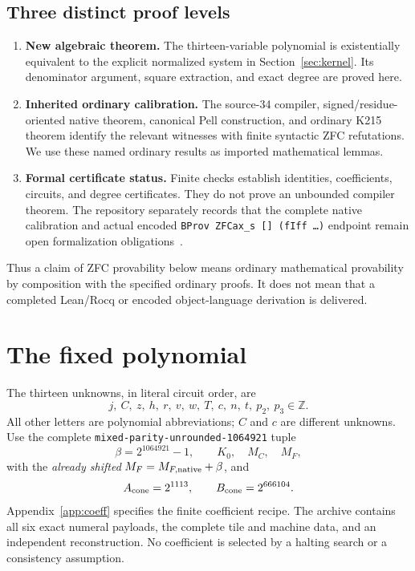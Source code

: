 \documentclass[11pt,a4paper]{article}
\theoremstyle{definition}\newtheorem{definition}[theorem]{Definition}
\theoremstyle{remark}\newtheorem{remark}[theorem]{Remark}
\newcommand{\Z}{\mathbb Z}\newcommand{\Q}{\mathbb Q}\newcommand{\N}{\mathbb N}
\numberwithin{equation}{section}
\begin{document}
\subsection{Three distinct proof levels}
\begin{enumerate}
\item \textbf{New algebraic theorem.} The thirteen-variable polynomial is
existentially equivalent to the explicit normalized system in
Section~\ref{sec:kernel}. Its denominator argument, square extraction,
and exact degree are proved here.
\item \textbf{Inherited ordinary calibration.} The source-34 compiler,
signed/residue-oriented native theorem, canonical Pell construction,
and ordinary K215 theorem identify the relevant witnesses with finite
syntactic ZFC refutations. We use these named ordinary results as
imported mathematical lemmas.
\item \textbf{Formal certificate status.} Finite checks establish
identities, coefficients, circuits, and degree certificates. They do not
prove an unbounded compiler theorem. The repository separately records
that the complete native calibration and actual encoded
\texttt{BProv ZFCax\_s [] (fIff \ldots)} endpoint remain open
formalization obligations~\cite{boundary,calibration}.
\end{enumerate}

Thus a claim of ZFC provability below means ordinary mathematical
provability by composition with the specified ordinary proofs.
It does not mean that a completed Lean/Rocq or encoded object-language
derivation is delivered.

\section{The fixed polynomial}\label{sec:equation}

The thirteen unknowns, in literal circuit order, are
\[
\boxed{j,\ C,\ z,\ h,\ r,\ v,\ w,\ T,\ c,\ n,\ t,\ p_2,\ p_3\in\Z.}
\]
All other letters are polynomial abbreviations; \(C\) and \(c\) are
different unknowns. Use the complete
\texttt{mixed-parity-unrounded-1064921} tuple
\[
\beta=2^{1064921}-1,\qquad K_0,\quad M_C,\quad M_F,
\]
with the \emph{already shifted} \(M_F=M_{F,\rm native}+\beta\), and
\[
A_{\rm cone}=2^{1113},\qquad B_{\rm cone}=2^{666104}.
\]
Appendix~\ref{app:coeff} specifies the finite coefficient recipe.
The archive contains all six exact numeral payloads, the complete tile
and machine data, and an independent reconstruction. No coefficient
is selected by a halting search or a consistency assumption.
\end{document}
